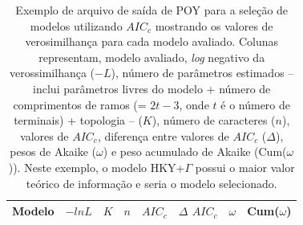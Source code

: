 \begin{refsection}
\begin{center}
\scriptsize 
\begin{table}[H]
\caption[Seleção de modelos em POY]{Exemplo de arquivo de saída de POY para a seleção de modelos utilizando $AIC_{c}$ mostrando os valores de verosimilhança para cada modelo avaliado. Colunas representam, modelo avaliado, \textit{log} negativo da verossimilhança ($-L$), número de parâmetros estimados -- inclui parâmetros livres do modelo + número de comprimentos de ramos (= $2t-3$, onde $t$ é o número de terminais) + topologia -- ($K$), número de caracteres ($n$), valores de $AIC_{c}$, diferença entre valores de $AIC_{c}$ ($\Delta$), pesos de Akaike ($\omega$) e peso acumulado de Akaike (Cum($\omega$)).  Neste exemplo, o modelo HKY+$\Gamma$ possui o maior valor teórico de informação e seria o modelo selecionado.} \label{tut13:table:modsel}

\begin{tabular}{llllllll}
\hline
\multicolumn{1}{c}{\textbf{Modelo}}&
\multicolumn{1}{c}{\textbf{$-lnL$}}&
\multicolumn{1}{c}{\textbf{$K$}}&
\multicolumn{1}{c}{\textbf{$n$}}&
\multicolumn{1}{c}{\textbf{$AIC_{c}$}}&
\multicolumn{1}{c}{\textbf{$\Delta$ $AIC_{c}$}}&
\multicolumn{1}{c}{\textbf{$\omega$}}&
\multicolumn{1}{c}{\textbf{Cum($\omega$)}}\\
\hline\hline


\end{tabular}
\end{table}
\end{center}
\end{refsection}
